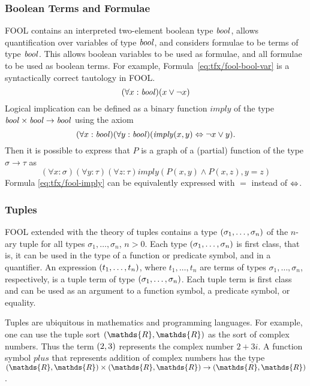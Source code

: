 \subsubsection{Boolean Terms and Formulae}

FOOL contains an interpreted two-element boolean type $\mathit{bool}$, allows 
quantification over variables of type $\mathit{bool}$, and considers formulae to 
be terms of type $\mathit{bool}$.
This allows boolean variables to be used as formulae, and all formulae to be 
used as boolean terms.
For example, Formula~\ref{eq:tfx/fool-bool-var} is a syntactically correct 
tautology in FOOL.
\begin{equation}\label{eq:tfx/fool-bool-var}
(\forall x:\mathit{bool})(x \lor \neg x)
\end{equation}
Logical implication can be defined as a binary function
$\mathit{imply}$ of the type $\mathit{bool} \times \mathit{bool} \to \mathit{bool}$ using the axiom
\begin{equation}\label{eq:tfx/fool-imply}
(\forall x:\mathit{bool})(\forall y:\mathit{bool})(\mathit{imply}(x,y) \Leftrightarrow \neg x \lor y).
\end{equation}
Then it is possible to express that $P$ is a graph of a (partial) function of 
the type $\sigma \to \tau$ as
\begin{equation}\label{eq:tfx/bool-arg-example}
(\forall x:\sigma)(\forall y:\tau)(\forall z:\tau)
\mathit{imply}(P(x,y) \land P(x,z), y = z)
\end{equation}
Formula \ref{eq:tfx/fool-imply} can be equivalently expressed with $=$ instead of
$\Leftrightarrow$.

\subsubsection{Tuples}
FOOL extended with the theory of tuples contains a type
$({\sigma_1,\ldots,\sigma_n})$ of the $n$-ary tuple for all types
$\sigma_1,\ldots,\sigma_n$, $n>0$. Each type
$({\sigma_1,\ldots,\sigma_n})$ is first class, that is, it can be
used in the type of a function or predicate symbol, and in a quantifier. 
An expression $({t_1,\ldots,t_n})$, where $t_1,\ldots,t_n$ are
terms of types $\sigma_1,\ldots,\sigma_n$, respectively, is a tuple term of 
type $({\sigma_1,\ldots,\sigma_n})$. 
Each tuple term is first class and can be used as an argument to a function 
symbol, a predicate symbol, or equality.

Tuples are ubiquitous in mathematics and programming languages. For example,
one can use the tuple sort $\tuple{\mathds{R},\mathds{R}}$ as the sort of
complex numbers. 
Thus the term $({2,3})$ represents the complex number $2+3i$. 
A function symbol $\mathit{plus}$ that represents addition of complex numbers 
has the type $\tuple{\mathds{R},\mathds{R}} \times 
\tuple{\mathds{R},\mathds{R}} \to \tuple{\mathds{R},\mathds{R}}$.


